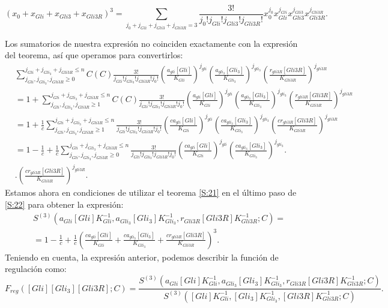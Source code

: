\begin{equation}
(x_0+x_{Gli}+x_{Gli3}+x_{Gli3R})^3=\sum_{j_0+j_{Gli}+j_{Gli3}+j_{Gli3R}=3}\frac{3!}{j_0!j_{Gli}!j_{Gli3}!j_{Gli3R}!}x_0^{j_0}x_{Gli}^{j_{Gli}}x_{Gli3}^{j_{Gli3}}x_{Gli3R}^{j_{Gli3R}}.\label{S:21}
\end{equation}

Los sumatorios de nuestra expresión no coinciden exactamente con la expresión del teorema, así que operamos para convertirlos: 
\begin{equation}
\begin{split}
&\sum_{j_{Gli}, j_{Gli_3}, j_{Gli3R}\geq0}^{j_{Gli}+ j_{Gli_3}+ j_{Gli3R}\leq n}\textit{C}(C)\frac{3!}{j_{Gli}! j_{Gli_3}! j_{Gli3R}!j_0!}
\left(\frac{a_{gli}[Gli]}{K_{Gli}}\right)^{j_{gli}}
\left(\frac{a_{gli_3}[Gli_3]}{K_{Gli_3}}\right)^{j_{gli_3}}
\left(\frac{r_{gli3R}[Gli3R]}{K_{Gli3R}}\right)^{j_{gli3R}}\\&=
1+\sum_{j_{Gli}, j_{Gli_3}, j_{Gli3R}\geq1}^{j_{Gli}+ j_{Gli_3}+ j_{Gli3R}\leq n}\textit{C}(C)\frac{3!}{j_{Gli}! j_{Gli_3}! j_{Gli3R}!j_0!}
\left(\frac{a_{gli}[Gli]}{K_{Gli}}\right)^{j_{gli}}
\left(\frac{a_{gli_3}[Gli_3]}{K_{Gli_3}}\right)^{j_{gli_3}}
\left(\frac{r_{gli3R}[Gli3R]}{K_{Gli3R}}\right)^{j_{gli3R}}\\&=
1+\frac{1}{c}\sum_{j_{Gli}, j_{Gli_3}, j_{Gli3R}\geq1}^{j_{Gli}+ j_{Gli_3}+ j_{Gli3R}\leq n}\frac{3!}{j_{Gli}! j_{Gli_3}! j_{Gli3R}!j_0!}
\left(\frac{ca_{gli}[Gli]}{K_{Gli}}\right)^{j_{gli}}
\left(\frac{ca_{gli_3}[Gli_3]}{K_{Gli_3}}\right)^{j_{gli_3}}
\left(\frac{cr_{gli3R}[Gli3R]}{K_{Gli3R}}\right)^{j_{gli3R}}\\&=
1-\frac{1}{c}+\frac{1}{c}\sum_{j_{Gli}, j_{Gli_3}, j_{Gli3R}\geq0}^{j_{Gli}+ j_{Gli_3}+ j_{Gli3R}\leq n}\frac{3!}{j_{Gli}! j_{Gli_3}! j_{Gli3R}!j_0!}
\left(\frac{ca_{gli}[Gli]}{K_{Gli}}\right)^{j_{gli}}
\left(\frac{ca_{gli_3}[Gli_3]}{K_{Gli_3}}\right)^{j_{gli_3}}.\\&.
\left(\frac{cr_{gli3R}[Gli3R]}{K_{Gli3R}}\right)^{j_{gli3R}}.
\end{split}
\label{S:22}
\end{equation}
Estamos ahora en condiciones de utilizar el teorema \ref{S:21} en el último paso de \ref{S:22} para obtener la expresión:
\begin{equation}
\begin{split}
&S^{(3)}(a_{Gli}[Gli]K_{Gli}^{-1},a_{Gli_3}[Gli_3]K_{Gli_3}^{-1},r_{Gli3R}[Gli3R]K_{Gli3R}^{-1};C)=\\&=
1-\frac{1}{c}+\frac{1}{c}\left(\frac{ca_{gli}[Gli]}{K_{Gli}}+\frac{ca_{gli_3}[Gli_3]}{K_{Gli_3}}+\frac{cr_{gli3R}[Gli3R]}{K_{Gli3R}}\right)^3.
\end{split}
\end{equation}
Teniendo en cuenta, la expresión anterior, podemos describir la función de regulación como: 
\begin{equation}
F_{reg}([Gli][Gli_3][Gli3R];C)=\frac{S^{(3)}(a_{Gli}[Gli]K_{Gli}^{-1},a_{Gli_3}[Gli_3]K_{Gli_3}^{-1},r_{Gli3R}[Gli3R]K_{Gli3R}^{-1};C)}{S^{(3)}([Gli]K_{Gli}^{-1},[Gli_3]K_{Gli_3}^{-1},[Gli3R]K_{Gli3R}^{-1};C)}.
\end{equation}

